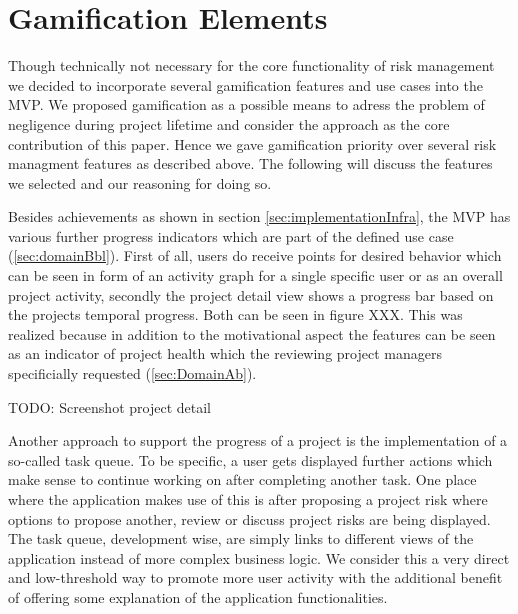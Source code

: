 
\section{Gamification Elements}
\label{sec:implementationGami}

Though technically not necessary for the core functionality of risk management we decided to incorporate several gamification features and use cases into the \ac{MVP}. We proposed gamification as a possible means to adress the problem of negligence during project lifetime and consider the approach as the core contribution of this paper. Hence we gave gamification priority over several risk managment features as described above. The following will discuss the features we selected and our reasoning for doing so.

Besides achievements as shown in section \ref{sec:implementationInfra}, the \ac{MVP} has various further progress indicators which are part of the defined use case (\ref{sec:domainBbl}). First of all, users do receive points for desired behavior which can be seen in form of an activity graph for a single specific user or as an overall project activity, secondly the project detail view shows a progress bar based on the projects temporal progress. Both can be seen in figure XXX. This was realized because in addition to the motivational aspect the features can be seen as an indicator of project health which the reviewing project managers specificially requested (\ref{sec:DomainAb}).

TODO: Screenshot project detail

Another approach to support the progress of a project is the implementation of a so-called task queue. To be specific, a user gets displayed further actions which make sense to continue working on after completing another task. One place where the application makes use of this is after proposing a project risk where options to propose another, review or discuss project risks are being displayed. The task queue, development wise, are simply links to different views of the application instead of more complex business logic. We consider this a very direct and low-threshold way to promote more user activity with the additional benefit of offering some explanation of the application functionalities.

